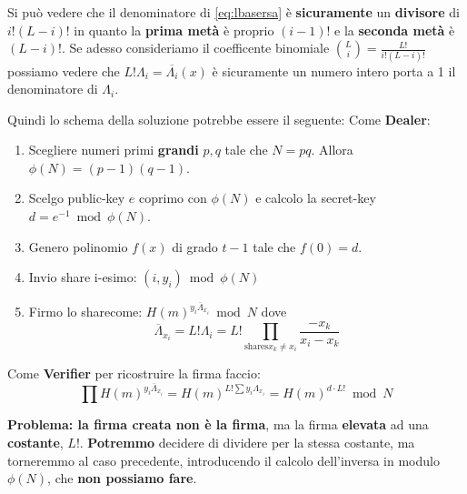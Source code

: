 \begin{remark}
Si può vedere che il denominatore di \cref{eq:lbasersa} è \textbf{sicuramente} un \textbf{divisore} di $i!(L-i)!$ in quanto la \textbf{prima metà} è proprio $(i-1)!$ e la \textbf{seconda metà} è $(L-i)!$. Se adesso consideriamo il coefficente binomiale $\binom{L}{i}=\frac{L!}{i!(L-i)!}$ possiamo vedere che $L!\Lambda_i=\overline{\Lambda_i}(x)$ è sicuramente un numero intero porta a 1 il denominatore di $\Lambda_i$.
\end{remark}
Quindi lo schema della soluzione potrebbe essere il seguente:
Come \textbf{Dealer}:
\begin{enumerate}
    \item Scegliere numeri primi \textbf{grandi} $p,q$ tale che $N=pq$. Allora $\phi(N)=(p-1)(q-1)$.
    \item Scelgo public-key $e$ coprimo con $\phi(N)$ e calcolo la secret-key $d=e^{-1}\bmod\phi(N)$.
    \item Genero polinomio $f(x)$ di grado $t-1$ tale che $f(0)=d$.
    \item Invio share i-esimo: $(i,y_i)\bmod\phi(N)$
    \item Firmo lo share\footnotemark come: $H(m)^{y_i\overline{\Lambda}_{x_i}}\bmod N$ dove
    \[\overline{\Lambda}_{x_i}=L!\Lambda_i=L!\prod_{\text{shares} x_k\ne x_i}\frac{-x_k}{x_i-x_k}\]
\end{enumerate}
Come \textbf{Verifier} per ricostruire la firma faccio:
\[\prod H(m)^{y_i\overline{\Lambda}_{x_i}}=H(m)^{L!\sum y_i\Lambda_{x_i}}=H(m)^{d\cdot L!}\bmod{N}\]
\begin{remark}
\textbf{Problema: la firma creata non è la firma}, ma la firma \textbf{elevata} ad una \textbf{costante}, $L!$. \textbf{Potremmo} decidere di dividere per la stessa costante, ma torneremmo al caso precedente, introducendo il calcolo dell'inversa in modulo $\phi(N)$, che \textbf{non possiamo fare}.\end{remark}
